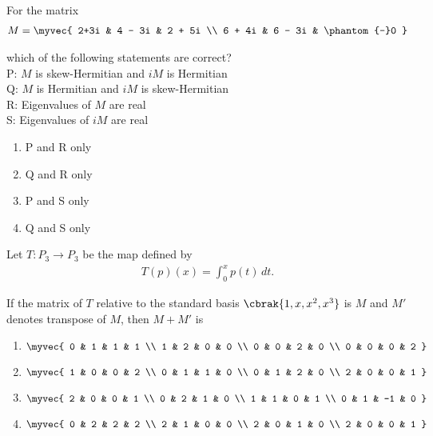 \begin{multicols}{2}
\item
For the matrix
\begin{align}
    M = \myvec{
2+3i & 4 - 3i & 2 + 5i \\
6 + 4i & 6 - 3i & \phantom{-}0
}
\end{align}


which of the following statements are correct?\\
P: $M$ is skew-Hermitian and $iM$ is Hermitian\\
Q: $M$ is Hermitian and $iM$ is skew-Hermitian\\
R: Eigenvalues of $M$ are real\\
S: Eigenvalues of $iM$ are real
\hfill{}
\begin{multicols}{2}
\begin{enumerate}
\item P and R only
\item Q and R only
\item P and S only
\item Q and S only
\end{enumerate}
\end{multicols}

\item
Let $T: P_3 \to P_3$ be the map defined by
\begin{align}
    T(p)(x) = \int_0^x p(t) \, dt.
\end{align}

If the matrix of $T$ relative to the standard basis $\cbrak{1, x, x^2, x^3}$ is $M$ and $M'$ denotes transpose of $M$, then $M + M'$ is
\hfill{}
\begin{enumerate}
\item $\myvec{
0 & 1 & 1 & 1 \\
1 & 2 & 0 & 0 \\
0 & 0 & 2 & 0 \\
0 & 0 & 0 & 2
}$
\item $\myvec{
1 & 0 & 0 & 2 \\
0 & 1 & 1 & 0 \\
0 & 1 & 2 & 0 \\
2 & 0 & 0 & 1
}$
\item $\myvec{
2 & 0 & 0 & 1 \\
0 & 2 & 1 & 0 \\
1 & 1 & 0 & 1 \\
0 & 1 & -1 & 0
}$
\item $\myvec{
0 & 2 & 2 & 2 \\
2 & 1 & 0 & 0 \\
2 & 0 & 1 & 0 \\
2 & 0 & 0 & 1
}$
\end{enumerate}


\end{multicols}
